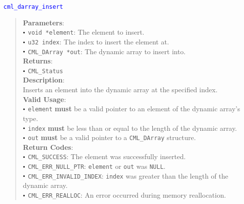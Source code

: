 \documentclass[a4paper,oneside,8pt]{extarticle}
\newcommand{\function}[1]{
  \noindent\textcolor{blue}{\texttt{#1}}
  \vspace{-0.3em}
}
\renewcommand{\dot}{\raisebox{0.3ex}{\scalebox{0.6}{$\bullet$}}}
\theoremstyle{definition}
\begin{document}
\function{cml\_darray\_insert}
\begin{quote}
  \textbf{Parameters}: \\
  $\dot$ \texttt{void *element}: The element to insert. \\
  $\dot$ \texttt{u32 index}: The index to insert the element at. \\
  $\dot$ \texttt{CML\_DArray *out}: The dynamic array to insert into. \\
  \textbf{Returns}: \\
  $\dot$ \texttt{CML\_Status} \\
  
  \vspace{-0.75em}
  \textbf{Description}: \\
  Inserts an element into the dynamic array at the specified index. \\

  \vspace{-0.75em}
  \textbf{Valid Usage}: \\
  $\dot$ \texttt{element} \textbf{must} be a valid pointer to an element of the dynamic array's type. \\
  $\dot$ \texttt{index} \textbf{must} be less than or equal to the length of the dynamic array. \\
  $\dot$ \texttt{out} \textbf{must} be a valid pointer to a \texttt{CML\_DArray} structure. \\

  \vspace{-0.75em}
  \textbf{Return Codes}: \\
  $\dot$ \texttt{CML\_SUCCESS}: The element was successfully inserted. \\
  $\dot$ \texttt{CML\_ERR\_NULL\_PTR}: \texttt{element} or \texttt{out} was \texttt{NULL}. \\
  $\dot$ \texttt{CML\_ERR\_INVALID\_INDEX}: \texttt{index} was greater than the length of the dynamic array. \\
  $\dot$ \texttt{CML\_ERR\_REALLOC}: An error occurred during memory reallocation. \\
\end{quote}
\end{document}
